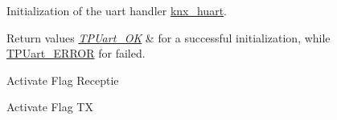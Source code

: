 Initialization of the uart handler \hyperlink{group___k_n_x___p_h___t_p_u_a_r_t___private___variables_ga9308eecc1a4f261fab20bd754fd5d5fc}{knx\+\_\+huart}. 


\begin{DoxyRetVals}{Return values}
{\em \hyperlink{group___k_n_x___t_p_uart___exported___types_gga75271248dbdd8cec608012ca76739f36aa8bc181a8cd20f68faf0314359f58a25}{T\+P\+Uart\+\_\+\+OK}} & for a successful initialization, while \hyperlink{group___k_n_x___t_p_uart___exported___types_gga75271248dbdd8cec608012ca76739f36add998069d703bc6f9b5aea74aa1e501e}{T\+P\+Uart\+\_\+\+E\+R\+R\+OR} for failed. \\
\hline
\end{DoxyRetVals}
Activate Flag Receptie

Activate Flag TX 